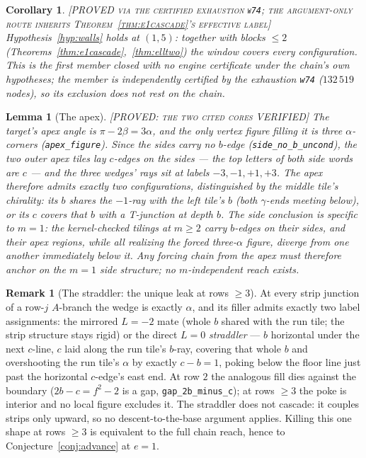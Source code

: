 \documentclass[11pt,reqno]{amsart}
\theoremstyle{plain}
\newtheorem{lemma}[theorem]{Lemma}
\newtheorem{corollary}[theorem]{Corollary}
\theoremstyle{definition}
\newtheorem{remark}[theorem]{Remark}
\newcommand{\lab}[1]{\hfill\textnormal{\footnotesize\textsc{[#1]}}}
\begin{document}
\begin{corollary}\label{cor:walls15}\lab{PROVED via the certified exhaustion \texttt{w74}; the argument-only route inherits Theorem~\ref{thm:e1cascade}'s effective label}
Hypothesis~\ref{hyp:walls} holds at $(1,5)$: together with blocks $\le2$
(Theorems~\ref{thm:e1cascade},~\ref{thm:elltwo}) the window covers every configuration. This is
the first member closed with no engine certificate under the chain's own hypotheses; the member is
independently certified by the exhaustion \texttt{w74} ($132\,519$ nodes), so its exclusion does
not rest on the chain.
\end{corollary}

\begin{lemma}[The apex]\label{lem:apex}\lab{PROVED: the two cited cores VERIFIED}
The target's apex angle is $\pi-2\beta=3\alpha$, and the only vertex figure filling it is three
$\alpha$-corners (\texttt{apex\_figure}). Since the sides carry no $b$-edge
(\texttt{side\_no\_b\_uncond}), the two outer apex tiles lay $c$-edges on the sides --- the top
letters of both side words are $c$ --- and the three wedges' rays sit at labels $-3,-1,+1,+3$.
The apex therefore admits exactly two configurations, distinguished by the middle tile's
chirality: its $b$ shares the $-1$-ray with the left tile's $b$ (both $\gamma$-ends meeting
below), or its $c$ covers that $b$ with a T-junction at depth $b$. The side conclusion is
specific to $m=1$: the kernel-checked tilings at $m\ge2$ carry $b$-edges on their sides, and
their apex regions, while all realizing the forced three-$\alpha$ figure, diverge from one
another immediately below it. Any forcing chain from the apex must therefore anchor on the
$m=1$ side structure; no $m$-independent reach exists.
\end{lemma}

\begin{remark}[The straddler: the unique leak at rows $\ge3$]\label{rem:straddler}
At every strip junction of a row-$j$ $A$-branch the wedge is exactly $\alpha$, and its filler
admits exactly two label assignments: the mirrored $L=-2$ mate (whole $b$ shared with the run
tile; the strip structure stays rigid) or the direct $L=0$ \emph{straddler} --- $b$ horizontal
under the next $c$-line, $c$ laid along the run tile's $b$-ray, covering that whole $b$ and
overshooting the run tile's $\alpha$ by exactly $c-b=1$, poking below the floor line just past
the horizontal $c$-edge's east end. At row $2$ the analogous fill dies against the boundary
($2b-c=f^2-2$ is a gap, \texttt{gap\_2b\_minus\_c}); at rows $\ge3$ the poke is interior and no
local figure excludes it. The straddler does not cascade: it couples strips only upward, so no
descent-to-the-base argument applies. Killing this one shape at rows $\ge3$ is equivalent to the
full chain reach, hence to Conjecture~\ref{conj:advance} at $e=1$.
\end{remark}
\end{document}

